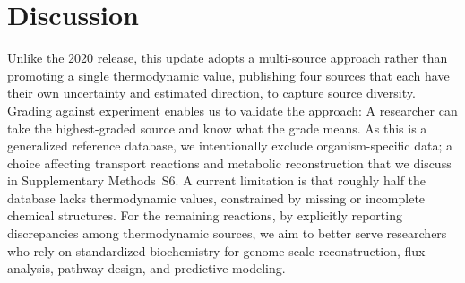 \section{Discussion}

Unlike the 2020 release, this update adopts a multi-source approach rather than promoting a single thermodynamic value, publishing four sources that each have their own uncertainty and estimated direction, to capture source diversity.
Grading against experiment enables us to validate the approach: A researcher can take the highest-graded source and know what the grade means.
As this is a generalized reference database, we intentionally exclude organism-specific data; a choice affecting transport reactions and metabolic reconstruction that we discuss in Supplementary Methods~S6.
A current limitation is that roughly half the database lacks thermodynamic values, constrained by missing or incomplete chemical structures.
For the remaining reactions, by explicitly reporting discrepancies among thermodynamic sources, we aim to better serve researchers who rely on standardized biochemistry for genome-scale reconstruction, flux analysis, pathway design, and predictive modeling.
